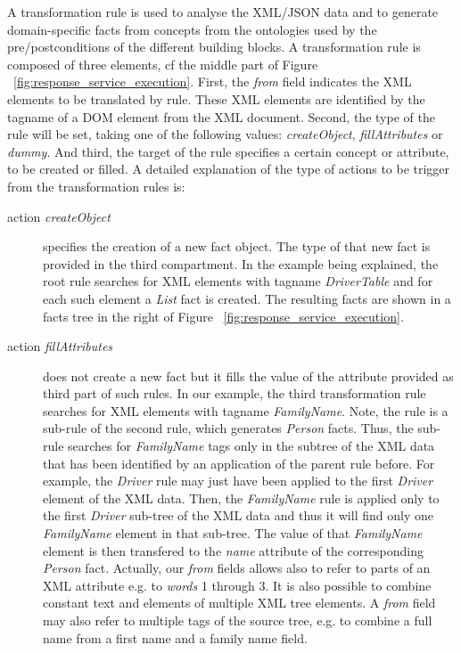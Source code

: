 \documentclass{article}
\begin{document}
A transformation rule is used to analyse the XML/JSON data and to generate domain-specific facts from concepts from the ontologies used by the pre/postconditions of the different building blocks. A transformation rule is composed of three elements, cf the middle part of Figure ~\ref{fig:response_service_execution}. First, the \textit{from} field indicates the XML elements to be translated by rule. These XML elements are identified by the tagname of a DOM element from the XML document. Second, the type of the rule will be set, taking one of the following values: \emph{createObject}, \emph{fillAttributes} or \emph{dummy}. And third, the target of the rule specifies a certain concept or attribute, to be created or filled. A detailed explanation of the type of actions to be trigger from the transformation rules is:
\begin{description}
	\item[action \emph{createObject}] specifies the creation of a new fact object. The type of that new fact is provided in the third compartment. In the example being explained, the root rule searches for XML elements with tagname \emph{DriverTable} and for each such element a \emph{List} fact is created. The resulting facts are shown in a facts tree in the right of Figure ~\ref{fig:response_service_execution}.
	\item[action \emph{fillAttributes}] does not create a new fact but it fills the value of the attribute provided as third part of such rules. In our example, the third transformation rule searches for XML elements with tagname \emph{FamilyName}. Note, the rule is a sub-rule of the second rule, which generates \emph{Person} facts. Thus, the sub-rule searches for \emph{FamilyName} tags only in the subtree of the XML data that has been identified by an application of the parent rule before. For example, the \emph{Driver} rule may just have been applied to the first \emph{Driver} element of the XML data. Then, the \emph{FamilyName} rule is applied only to the first \emph{Driver} sub-tree of the XML data and thus it will find only one \emph{FamilyName} element in that sub-tree. The value of that \emph{FamilyName} element is then transfered to the \emph{name} attribute of the corresponding \emph{Person} fact. Actually, our \textit{from} fields allows also to refer to parts of an XML attribute e.g. to \textit{words} 1 through 3. It is also possible to combine constant text and elements of multiple XML tree elements. A \textit{from} field may also refer to multiple tags of the source tree, e.g. to combine a full name from a first name and a family name field.  

\end{description}
\end{document}
